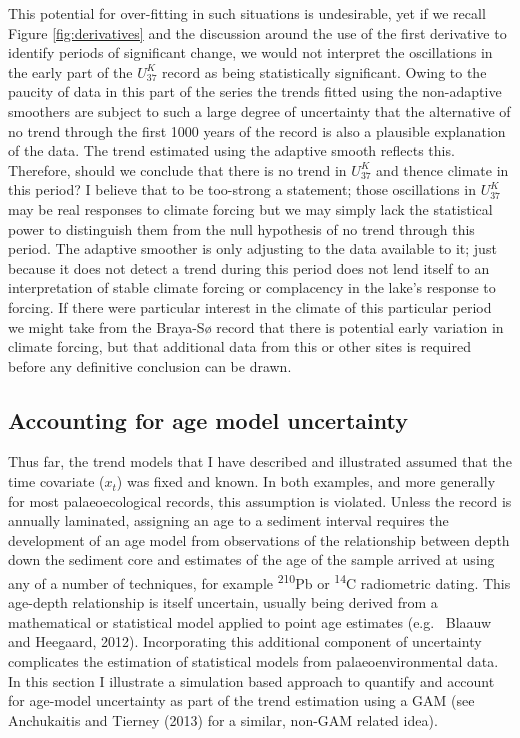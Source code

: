 \documentclass[12pt,]{article}
\newcommand{\uk}{\ensuremath{\mathit{U}^{\mathit{K}}_{\mathup{37}}}}
\begin{document}
This potential for over-fitting in such situations is undesirable, yet
if we recall Figure \ref{fig:derivatives} and the discussion around the
use of the first derivative to identify periods of significant change,
we would not interpret the oscillations in the early part of the \uk{}
record as being statistically significant. Owing to the paucity of data
in this part of the series the trends fitted using the non-adaptive
smoothers are subject to such a large degree of uncertainty that the
alternative of no trend through the first 1000 years of the record is
also a plausible explanation of the data. The trend estimated using the
adaptive smooth reflects this. Therefore, should we conclude that there
is no trend in \uk{} and thence climate in this period? I believe that
to be too-strong a statement; those oscillations in \uk{} may be real
responses to climate forcing but we may simply lack the statistical
power to distinguish them from the null hypothesis of no trend through
this period. The adaptive smoother is only adjusting to the data
available to it; just because it does not detect a trend during this
period does not lend itself to an interpretation of stable climate
forcing or complacency in the lake's response to forcing. If there were
particular interest in the climate of this particular period we might
take from the Braya-Sø record that there is potential early variation in
climate forcing, but that additional data from this or other sites is
required before any definitive conclusion can be drawn.

\subsection{Accounting for age model
uncertainty}\label{accounting-for-age-model-uncertainty}

Thus far, the trend models that I have described and illustrated assumed
that the time covariate (\(x_t\)) was fixed and known. In both examples,
and more generally for most palaeoecological records, this assumption is
violated. Unless the record is annually laminated, assigning an age to a
sediment interval requires the development of an age model from
observations of the relationship between depth down the sediment core
and estimates of the age of the sample arrived at using any of a number
of techniques, for example \textsuperscript{210}Pb or
\textsuperscript{14}C radiometric dating. This age-depth relationship is
itself uncertain, usually being derived from a mathematical or
statistical model applied to point age estimates (e.g.~ Blaauw and
Heegaard, 2012). Incorporating this additional component of uncertainty
complicates the estimation of statistical models from
palaeoenvironmental data. In this section I illustrate a simulation
based approach to quantify and account for age-model uncertainty as part
of the trend estimation using a GAM (see Anchukaitis and Tierney (2013)
for a similar, non-GAM related idea).
\end{document}
